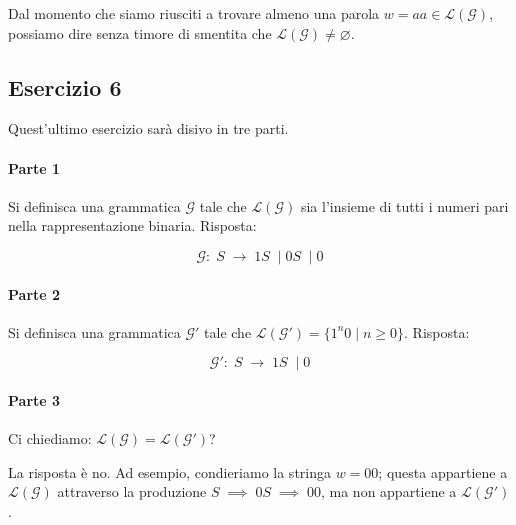 \documentclass[class=book, crop=false, oneside, 12pt]{standalone}
\begin{document}
\noindent Dal momento che siamo riusciti a trovare almeno una parola \(w = aa \in \mathcal{L(G)}\), possiamo dire senza timore di smentita che \(\mathcal{L(G)} \neq \varnothing\).

\subsection*{Esercizio 6}
Quest'ultimo esercizio sarà disivo in tre parti.

\paragraph{Parte 1}
Si definisca una grammatica \(\mathcal{G}\) tale che \(\mathcal{L(G)}\) sia l'insieme di tutti i numeri pari nella rappresentazione binaria. Risposta:

\begin{equation*}
  \mathcal{G}:\; S \; \to\; 1S\; \mid 0S\; \mid 0
\end{equation*}

\paragraph{Parte 2}
Si definisca una grammatica \(\mathcal{G'}\) tale che \(\mathcal{L(G')} = \{ 1^n0 \mid n \geq 0 \}\). Risposta:

\begin{equation*}
  \mathcal{G'}:\; S\; \to\; 1S\; \mid 0
\end{equation*}

\paragraph{Parte 3}
Ci chiediamo: \(\mathcal{L(G)} = \mathcal{L(G')}\)?

La risposta è no. Ad esempio, condieriamo la stringa \(w = 00\); questa appartiene a \(\mathcal{L(G)}\) attraverso la produzione \(S\; \implies\; 0S\; \implies\; 00 \), ma non appartiene a \(\mathcal{L(G')}\).
\end{document}
